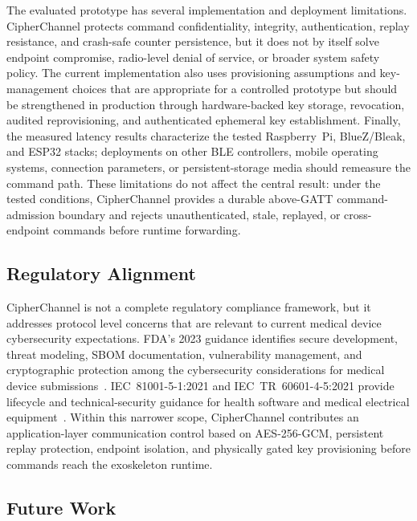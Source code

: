 \documentclass[journal]{IEEEtran}
\begin{document}
The evaluated prototype has several implementation and deployment limitations. CipherChannel protects command confidentiality, integrity, authentication, replay resistance, and crash-safe counter persistence, but it does not by itself solve endpoint compromise, radio-level denial of service, or broader system safety policy. The current implementation also uses provisioning assumptions and key-management choices that are appropriate for a controlled prototype but should be strengthened in production through hardware-backed key storage, revocation, audited reprovisioning, and authenticated ephemeral key establishment. Finally, the measured latency results characterize the tested Raspberry~Pi, BlueZ/Bleak, and ESP32 stacks; deployments on other BLE controllers, mobile operating systems, connection parameters, or persistent-storage media should remeasure the command path. These limitations do not affect the central result: under the tested conditions, CipherChannel provides a durable above-GATT command-admission boundary and rejects unauthenticated, stale, replayed, or cross-endpoint commands before runtime forwarding.

\subsection{Regulatory Alignment}
\label{sec:regulatory}

CipherChannel is not a complete regulatory compliance framework, but it addresses protocol level concerns that are relevant to current medical device cybersecurity expectations. FDA's 2023 guidance identifies secure development, threat modeling, SBOM documentation, vulnerability management, and cryptographic protection among the cybersecurity considerations for medical device submissions~\cite{fda2023guidance}. IEC~81001-5-1:2021 and IEC~TR~60601-4-5:2021 provide lifecycle and technical-security guidance for health software and medical electrical equipment~\cite{iec80001, iec81001,iec60601_4_5}. Within this narrower scope, CipherChannel contributes an application-layer communication control based on AES-256-GCM, persistent replay protection, endpoint isolation, and physically gated key provisioning before commands reach the exoskeleton runtime.

\subsection{Future Work}
\label{sec:futurework}
\end{document}
